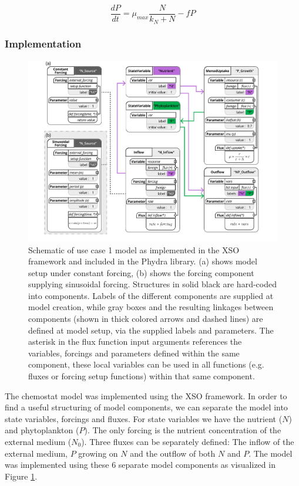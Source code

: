 \documentclass[journal abbreviation, manuscript]{copernicus}
\begin{document}
\begin{equation}
    \frac{d P}{d t} =
    \mu_{max} \frac{N}{k_N + N} 
    - f P
\end{equation}


\subsubsection{Implementation}

\begin{figure}[t]
\includegraphics[width=15cm]{Figures/firstdraft_schematics/code_schematics/Chemostat.pdf}
\caption{Schematic of use case 1 model as implemented in the XSO framework and included in the Phydra library. (a) shows model setup under constant forcing, (b) shows the forcing component supplying sinusoidal forcing. Structures in solid black are hard-coded into components. Labels of the different components are supplied at model creation, while gray boxes and the resulting linkages between components (shown in thick colored arrows and dashed lines) are defined at model setup, via the supplied labels and parameters. The asterisk in the flux function input arguments references the variables, forcings and parameters defined within the same component, these local variables can be used in all functions (e.g. fluxes or forcing setup functions) within that same component.}
\label{Figure:CodeSchematics_1}
\end{figure}

The chemostat model was implemented using the XSO framework. In order to find a useful structuring of model components, we can separate the model into state variables, forcings and fluxes. For state variables we have the nutrient ($N$) and phytoplankton ($P$). The only forcing is the nutrient concentration of the external medium ($N_0$). Three fluxes can be separately defined: The inflow of the external medium, $P$ growing on $N$ and the outflow of both $N$ and $P$.
The model was implemented using these 6 separate model components as visualized in Figure \ref{Figure:CodeSchematics_1}.
\end{document}
